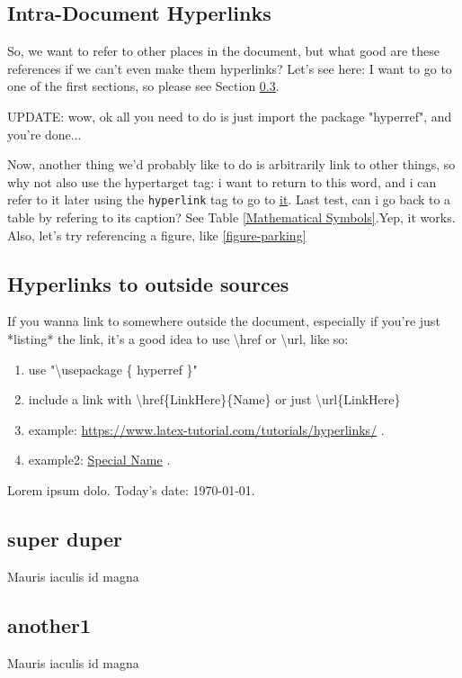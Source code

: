 \documentclass[a4paper,12pt]{article} %
\begin{document}
\subsection{Intra-Document Hyperlinks}
So, we want to refer to other places in the document, but what good are these references if we can't even make them hyperlinks? Let's see here: I want to go to one of the first sections, so please see Section \ref{super duper}. 

UPDATE: wow, ok all you need to do is just import the package "hyperref", and you're done...

Now, another thing we'd probably like to do is arbitrarily link to other things, so why not also use the hypertarget tag: 
i want to return to this \hypertarget{special_word}{word}, and i can refer to it later using the \texttt{hyperlink} tag to go to \hyperlink{special_word}{it}. 
Last test, can i go back to a table by refering to its caption? See Table \ref{Mathematical Symbols}.Yep, it works. Also, let's try referencing a figure, like \ref{figure-parking}


\subsection{Hyperlinks to outside sources}
If you wanna link to somewhere outside the document, especially if you're just *listing* the link, it's a good idea to use \textbackslash href or \textbackslash url, like so: 

\begin{enumerate} \itemsep=-0.5em
\item use "\textbackslash usepackage \{ hyperref \}"
\item include a link with \textbackslash href\{LinkHere\}\{Name\} or just \textbackslash url\{LinkHere\}
\item example: \url{https://www.latex-tutorial.com/tutorials/hyperlinks/} .
\item example2: \href{https://www.latex-tutorial.com/tutorials/hyperlinks/}{Special Name} .

\end{enumerate}


Lorem ipsum dolo. Today's date: \today.
\subsection{super duper}
\label{super duper}
Mauris iaculis id magna 
\subsection{another1}
Mauris iaculis id magna 
\end{document}

